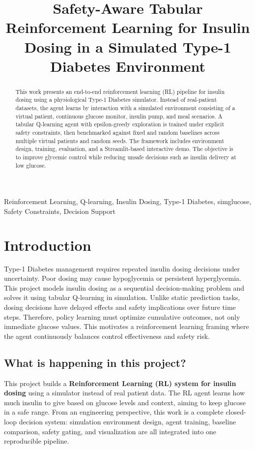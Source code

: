 \documentclass[conference]{IEEEtran}
\title{Safety-Aware Tabular Reinforcement Learning for Insulin Dosing in a Simulated Type-1 Diabetes Environment}
\author{%
\IEEEauthorblockN{Parth Srivastava (23BCE216)}
\IEEEauthorblockA{Department of Computer Science and Engineering \\
Nirma University \\
Course Code: 3CS108ME24}
\and
\IEEEauthorblockN{Nihar Mehta (23BCE197)}
\IEEEauthorblockA{Department of Computer Science and Engineering \\
Nirma University \\
Course Code: 3CS108ME24}
}
\begin{document}
\maketitle

\begin{abstract}
This work presents an end-to-end reinforcement learning (RL) pipeline for insulin dosing using a physiological Type-1 Diabetes simulator. Instead of real-patient datasets, the agent learns by interaction with a simulated environment consisting of a virtual patient, continuous glucose monitor, insulin pump, and meal scenarios. A tabular Q-learning agent with epsilon-greedy exploration is trained under explicit safety constraints, then benchmarked against fixed and random baselines across multiple virtual patients and random seeds. The framework includes environment design, training, evaluation, and a Streamlit-based interactive demo. The objective is to improve glycemic control while reducing unsafe decisions such as insulin delivery at low glucose.
\end{abstract}

\begin{IEEEkeywords}
Reinforcement Learning, Q-learning, Insulin Dosing, Type-1 Diabetes, simglucose, Safety Constraints, Decision Support
\end{IEEEkeywords}

\section{Introduction}
Type-1 Diabetes management requires repeated insulin dosing decisions under uncertainty. Poor dosing may cause hypoglycemia or persistent hyperglycemia. This project models insulin dosing as a sequential decision-making problem and solves it using tabular Q-learning in simulation.
Unlike static prediction tasks, dosing decisions have delayed effects and safety implications over future time steps. Therefore, policy learning must optimize cumulative outcomes, not only immediate glucose values. This motivates a reinforcement learning framing where the agent continuously balances control effectiveness and safety risk.

\subsection{What is happening in this project?}
This project builds a \textbf{Reinforcement Learning (RL) system for insulin dosing} using a simulator instead of real patient data. The RL agent learns how much insulin to give based on glucose levels and context, aiming to keep glucose in a safe range.
From an engineering perspective, this work is a complete closed-loop decision system: simulation environment design, agent training, baseline comparison, safety gating, and visualization are all integrated into one reproducible pipeline.
\end{document}

